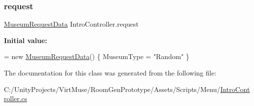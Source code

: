 \subsubsection{\texorpdfstring{request}{request}}
{\footnotesize\ttfamily \mbox{\hyperlink{class_museum_request_data}{Museum\+Request\+Data}} Intro\+Controller.\+request\hspace{0.3cm}{\ttfamily [private]}}

{\bfseries Initial value\+:}
\begin{DoxyCode}
= \textcolor{keyword}{new} \mbox{\hyperlink{class_museum_request_data}{MuseumRequestData}}()
    \{
        MuseumType = \textcolor{stringliteral}{"Random"}
    \}
\end{DoxyCode}


The documentation for this class was generated from the following file\+:\begin{DoxyCompactItemize}
\item 
C\+:/\+Unity\+Projects/\+Virt\+Muse/\+Room\+Gen\+Prototype/\+Assets/\+Scripts/\+Menu/\mbox{\hyperlink{_intro_controller_8cs}{Intro\+Controller.\+cs}}\end{DoxyCompactItemize}
